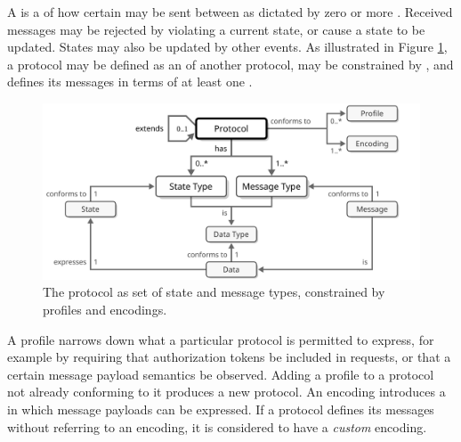 A  is a  of how certain  may be sent between  as dictated by zero or more .
Received messages may be rejected by violating a current state, or cause a state to be updated.
States may also be updated by other events. 
As illustrated in Figure \ref{fig:protocol}, a protocol may be defined as an  of another protocol, may be constrained by , and defines its messages in terms of at least one .

\begin{figure}[ht!]
  \centering
  \includegraphics[scale=0.9]{figures/protocol}
  \caption{
    The protocol as set of state and message types, constrained by profiles and encodings.
  }
  \label{fig:protocol}
\end{figure}

A profile narrows down what a particular protocol is permitted to express, for example by requiring that authorization tokens be included in requests, or that a certain message payload semantics be observed.
Adding a profile to a protocol not already conforming to it produces a new protocol.
An encoding introduces a  in which message payloads can be expressed.
If a protocol defines its messages without referring to an encoding, it is considered to have a \textit{custom} encoding.
